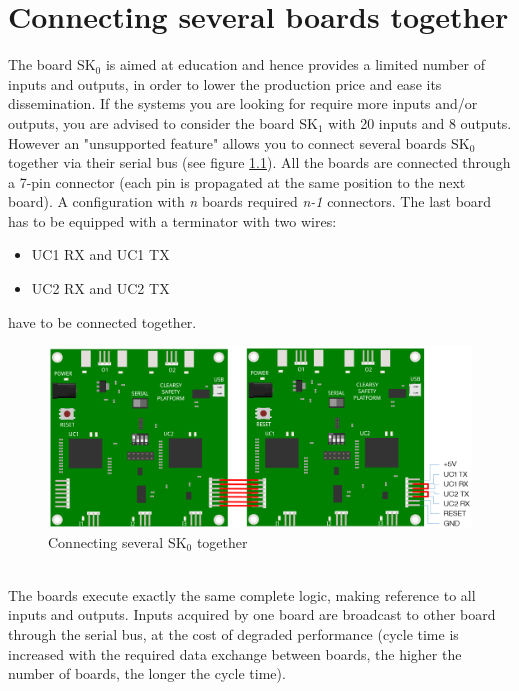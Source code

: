 
\chapter{Connecting several boards together}

The board SK$_0$ is aimed at education and hence provides a limited number of inputs and outputs, in order to lower the production price and ease its dissemination. If the systems you are looking for require more inputs and/or outputs, you are advised to consider the board SK$_1$ with 20 inputs and 8 outputs. \\
However an "unsupported feature" allows you to connect several boards SK$_0$ together via their serial bus (see figure \ref{annexes:SK0-HW-serial-bus}). All the boards are connected through a 7-pin connector (each pin is propagated at the same position to the next board). A configuration with \textit{n} boards required  \textit{n-1} connectors. The last board has to be equipped with a terminator with two wires: 
\begin{itemize}
    \item UC1 RX and UC1 TX
    \item UC2 RX and UC2 TX 
\end{itemize}
have to be connected together.
\begin{figure}[h]
\centering\includegraphics[scale=0.30]{Pictures/chapterAnnexes/SK0-connectinb-boards.png}
\caption{Connecting several SK$_0$ together}
\label{annexes:SK0-HW-serial-bus}
\end{figure} \\
The boards execute exactly the same complete logic, making reference to all inputs and outputs. Inputs acquired by one board are broadcast to other board through the serial bus, at the cost of degraded performance (cycle time is increased with the required data exchange between boards, the higher the number of boards, the longer the cycle time).\\

